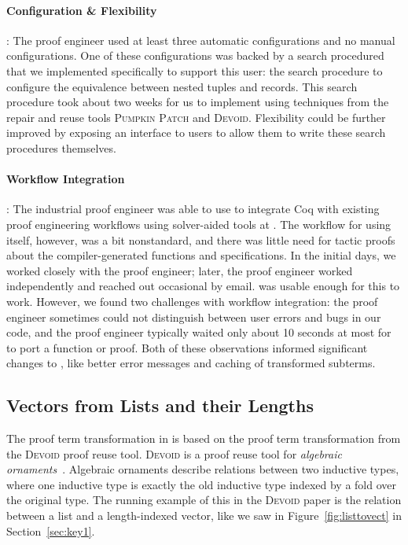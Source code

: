 \paragraph{Configuration \& Flexibility}:
The proof engineer used at least three automatic configurations and no manual configurations.
One of these configurations was backed by a search procedured that we implemented
specifically to support this user: the search procedure to
configure the equivalence between nested tuples and records.
This search procedure took about two weeks for us to implement using techniques from
the repair and reuse tools \textsc{Pumpkin Patch} and \textsc{Devoid}.
Flexibility could be further improved by exposing an interface to users to allow them to
write these search procedures themselves.

\paragraph{Workflow Integration}:
The industrial proof engineer was able to use \toolname to integrate Coq with existing proof engineering
workflows using solver-aided tools at \company.
The workflow for using \toolname itself, however, was a bit nonstandard,
and there was little need for tactic proofs about the compiler-generated functions and specifications.
In the initial days, we worked closely with the proof engineer;
later, the proof engineer worked independently and reached out occasional by email.
\toolname was usable enough for this to work.
However, we found two challenges with workflow integration:
the proof engineer sometimes could not distinguish between user errors and bugs in our code,
and the proof engineer typically waited only about 10 seconds at most for \toolname
to port a function or proof.
Both of these observations informed significant changes to \toolname, like better error messages
and caching of transformed subterms.

\subsection{Vectors from Lists and their Lengths}
\label{sec:dep}

The proof term transformation in \toolname is based on the proof term transformation from
the \textsc{Devoid} proof reuse tool.
\textsc{Devoid} is a proof reuse tool for \textit{algebraic ornaments}~\cite{mcbride}. Algebraic ornaments describe relations
between two inductive types, where one inductive type is exactly the old inductive type indexed by a fold
over the original type.
The running example of this in the \textsc{Devoid} paper is the relation between a list and a
length-indexed vector, like we saw in Figure~\ref{fig:listtovect} in Section~\ref{sec:key1}.

